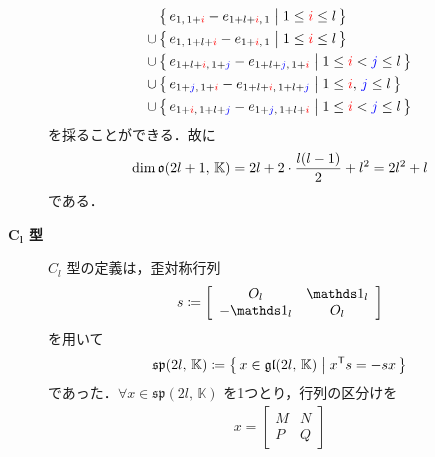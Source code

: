 \documentclass{ltjsarticle}
\theoremstyle{mystyle} %
\numberwithin{equation}{section}
\begin{document}
\begin{description}
\begin{align}
        &\bigl\{\, e_{1,\, 1 + \textcolor{red}{i}} - e_{1 + l + \textcolor{red}{i},\, 1} \bigm| 1 \le \textcolor{red}{i} \le l \,\bigr\} \\
        \cup\, &\bigl\{\, e_{1,\, 1 + l + \textcolor{red}{i}} - e_{1 + \textcolor{red}{i},\, 1} \bigm| 1 \le \textcolor{red}{i} \le l \,\bigr\} \\
        \cup\, &\bigl\{\, e_{1 + l + \textcolor{red}{i},\, 1 + \textcolor{blue}{j}} - e_{1 + l + \textcolor{blue}{j},\, 1 + \textcolor{red}{i}} \bigm| 1 \le \textcolor{red}{i} < \textcolor{blue}{j} \le l \,\bigr\} \\
        \cup\, &\bigl\{\, e_{1 + \textcolor{blue}{j},\, 1 + \textcolor{red}{i}} - e_{1 + l + \textcolor{red}{i},\, 1 + l + \textcolor{blue}{j}} \bigm| 1 \le \textcolor{red}{i},\, \textcolor{blue}{j} \le l \,\bigr\}  \\
        \cup\, &\bigl\{\, e_{1 + \textcolor{red}{i},\, 1 + l + \textcolor{blue}{j}} - e_{1 + \textcolor{blue}{j},\, 1 + l + \textcolor{red}{i}} \bigm| 1 \le \textcolor{red}{i} < \textcolor{blue}{j} \le l \,\bigr\} 
    \end{align}
    を採ることができる．故に
    \begin{align}
        \dim \mathfrak{o} (2l+1,\, \mathbb{K}) = 2l + 2 \cdot \frac{l (l-1)}{2} + l^2 = 2l^2 + l
    \end{align}
    である．
    \item[\textbf{$\bm{C_l}$ 型}] $C_l$ 型の定義は，歪対称行列
    \begin{align}
        s \coloneqq 
        \left[
            \begin{array}{cc}
                O_l &\unity_l \\ 
                -\unity_l &O_l
            \end{array}
        \right]
    \end{align}
    を用いて
    \begin{align}
        \label{eq:ex1-1-8C}
        \mathfrak{sp} (2l,\, \mathbb{K}) \coloneqq \bigl\{\, x \in \mathfrak{gl}(2l,\, \mathbb{K}) \bigm| x^{\mathsf{T}}s = -sx  \,\bigr\} 
    \end{align}
    であった．$\forall x \in \mathfrak{sp} (2l,\, \mathbb{K})$ を1つとり，行列の区分けを
    \begin{align}
        x = \left[
            \begin{array}{cc}
                M & N \\  
                P & Q 
            \end{array}
        \right]

\end{align}
\end{description}
\end{document}
